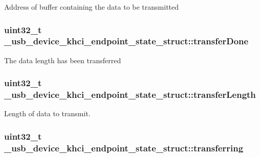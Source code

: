 Address of buffer containing the data to be transmitted \hypertarget{struct__usb__device__khci__endpoint__state__struct_a3efa2b63b740c832f14175350d98fa43}{
\subsubsection[{transfer\-Done}]{\setlength{\rightskip}{0pt plus 5cm}uint32\-\_\-t \-\_\-usb\-\_\-device\-\_\-khci\-\_\-endpoint\-\_\-state\-\_\-struct\-::transfer\-Done}}\label{struct__usb__device__khci__endpoint__state__struct_a3efa2b63b740c832f14175350d98fa43}
The data length has been transferred \hypertarget{struct__usb__device__khci__endpoint__state__struct_a68c3c4b6c6b3b57a22bbd10cc160dba4}{
\subsubsection[{transfer\-Length}]{\setlength{\rightskip}{0pt plus 5cm}uint32\-\_\-t \-\_\-usb\-\_\-device\-\_\-khci\-\_\-endpoint\-\_\-state\-\_\-struct\-::transfer\-Length}}\label{struct__usb__device__khci__endpoint__state__struct_a68c3c4b6c6b3b57a22bbd10cc160dba4}
Length of data to transmit. \hypertarget{struct__usb__device__khci__endpoint__state__struct_aef586b878d7ac44fd3e0b3bafc3a4f61}{
\subsubsection[{transferring}]{\setlength{\rightskip}{0pt plus 5cm}uint32\-\_\-t \-\_\-usb\-\_\-device\-\_\-khci\-\_\-endpoint\-\_\-state\-\_\-struct\-::transferring}}\label{struct__usb__device__khci__endpoint__state__struct_aef586b878d7ac44fd3e0b3bafc3a4f61}
